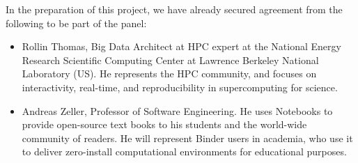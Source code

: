 In the preparation of this project, we have already secured agreement from the
following to be part of the panel:
\begin{itemize}
\item Rollin Thomas, Big Data Architect at HPC expert at the National Energy
  Research Scientific Computing Center at Lawrence Berkeley National Laboratory
  (US). He represents the HPC community, and focuses on interactivity,
  real-time, and reproducibility in supercomputing for science.
\item Andreas Zeller, Professor of Software Engineering. He uses Notebooks 
  to provide open-source text books to his students and the world-wide
  community of readers. He will represent Binder users in academia, who use it 
  to deliver zero-install computational environments for educational
  purposes.
\end{itemize}